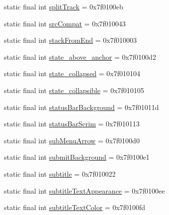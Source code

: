 \begin{CompactItemize}
static final int \hyperlink{classandroid_1_1support_1_1graphics_1_1drawable_1_1animated_1_1_r_1_1attr_367bd600357cc16aadfdb95faeb9dc1e}{splitTrack} = 0x7f0100eb
\item 
static final int \hyperlink{classandroid_1_1support_1_1graphics_1_1drawable_1_1animated_1_1_r_1_1attr_f20cf05e6ae922174b8c1604926e07e8}{srcCompat} = 0x7f010043
\item 
static final int \hyperlink{classandroid_1_1support_1_1graphics_1_1drawable_1_1animated_1_1_r_1_1attr_808b1985f8087b5ce869c4692c8442b7}{stackFromEnd} = 0x7f010003
\item 
static final int \hyperlink{classandroid_1_1support_1_1graphics_1_1drawable_1_1animated_1_1_r_1_1attr_002313b5ae0f1a59a5f25228a5c62824}{state\_\-above\_\-anchor} = 0x7f0100d2
\item 
static final int \hyperlink{classandroid_1_1support_1_1graphics_1_1drawable_1_1animated_1_1_r_1_1attr_579a8ec047cb5274d2822eedec4c2285}{state\_\-collapsed} = 0x7f010104
\item 
static final int \hyperlink{classandroid_1_1support_1_1graphics_1_1drawable_1_1animated_1_1_r_1_1attr_716ef46227b8907567db245c0207b287}{state\_\-collapsible} = 0x7f010105
\item 
static final int \hyperlink{classandroid_1_1support_1_1graphics_1_1drawable_1_1animated_1_1_r_1_1attr_13591a3101fb9c4dffb858ef8d8cdeb9}{statusBarBackground} = 0x7f01011d
\item 
static final int \hyperlink{classandroid_1_1support_1_1graphics_1_1drawable_1_1animated_1_1_r_1_1attr_6c8bc17a4d47cd8c4bcc145b61083515}{statusBarScrim} = 0x7f010113
\item 
static final int \hyperlink{classandroid_1_1support_1_1graphics_1_1drawable_1_1animated_1_1_r_1_1attr_c07d4287149154d797dd34d06c294722}{subMenuArrow} = 0x7f0100d0
\item 
static final int \hyperlink{classandroid_1_1support_1_1graphics_1_1drawable_1_1animated_1_1_r_1_1attr_83f6e4cb86cec9799453c5f1b421e7c4}{submitBackground} = 0x7f0100e1
\item 
static final int \hyperlink{classandroid_1_1support_1_1graphics_1_1drawable_1_1animated_1_1_r_1_1attr_4b9fa484d1e7786c383b0b67c96b9753}{subtitle} = 0x7f010022
\item 
static final int \hyperlink{classandroid_1_1support_1_1graphics_1_1drawable_1_1animated_1_1_r_1_1attr_1913e8aa7c0bd5508c3d74a06a1fcad5}{subtitleTextAppearance} = 0x7f0100ee
\item 
static final int \hyperlink{classandroid_1_1support_1_1graphics_1_1drawable_1_1animated_1_1_r_1_1attr_94e9055978f852ee4b6bc3f6ef3c5a43}{subtitleTextColor} = 0x7f0100fd

\end{CompactItemize}
